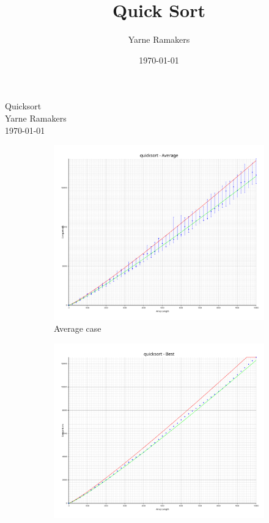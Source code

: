 \documentclass[a4paper]{article}
\title{Quick Sort}
\author{Yarne Ramakers}
\date{\today}
\begin{document}
\begin{center}
  Quicksort \\
  Yarne Ramakers \\
  \today \\
\end{center}

\begin{figure}[h]
  \begin{subfigure}{0.3\textwidth}
    \includegraphics[width=\textwidth]{../plots/quicksort-average.png}
    \caption{Average case}
    \label{fig:merge-avg}
  \end{subfigure}
  \begin{subfigure}[b]{0.3\textwidth}
    \includegraphics[width=\textwidth]{../plots/quicksort-best.png}

\end{subfigure}
\end{figure}
\end{document}

